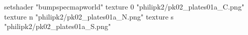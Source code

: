 setshader "bumpspecmapworld"
    texture 0 "philipk2/pk02_plates01a_C.png"
    texture n "philipk2/pk02_plates01a_N.png"
    texture s "philipk2/pk02_plates01a_S.png"